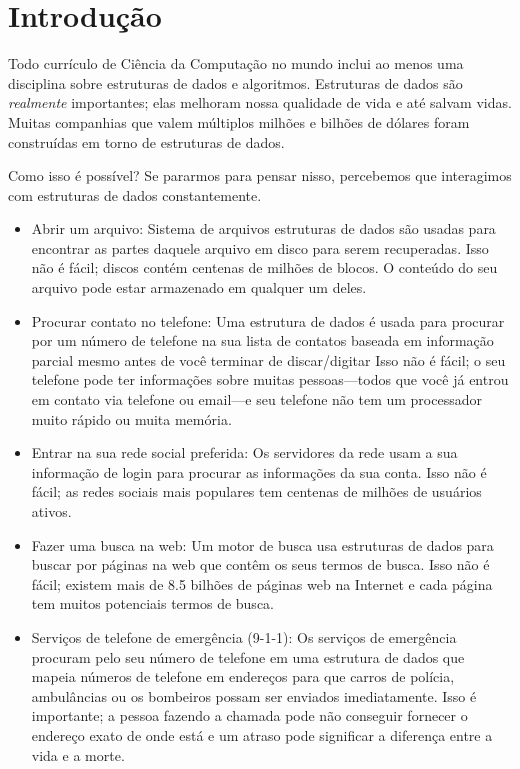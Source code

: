 \chapter{Introdução}
Todo currículo de Ciência da Computação no mundo inclui ao menos uma disciplina sobre estruturas de dados e algoritmos.
Estruturas de dados são \emph{realmente} importantes;
elas melhoram nossa qualidade de vida e até salvam vidas.
Muitas companhias que valem múltiplos milhões e bilhões de dólares foram construídas em torno de estruturas de dados.

Como isso é possível? Se pararmos para pensar nisso, percebemos que interagimos com estruturas de dados constantemente.

\begin{itemize}
  \item  Abrir um arquivo: Sistema de arquivos 
    estruturas de dados são usadas para encontrar
    as partes daquele arquivo em disco para serem recuperadas.
    Isso não é fácil; discos contém centenas de milhões de blocos.
    O conteúdo do seu arquivo pode estar armazenado em qualquer um deles.
  \item Procurar contato no telefone: Uma estrutura de dados é usada para procurar por um número de telefone na sua lista de contatos 
    baseada em informação parcial mesmo antes de você terminar de discar/digitar
    Isso não é fácil;
o seu telefone pode ter informações sobre muitas pessoas---todos que você já entrou em contato via telefone ou email---e seu telefone não tem um processador muito rápido ou muita memória.
  \item Entrar na sua rede social preferida:
    Os servidores da rede
    usam a sua informação de login para procurar as informações da sua conta.
    Isso não é fácil; as redes sociais mais populares tem centenas de milhões de usuários ativos.
  \item Fazer uma busca na web: 
    Um motor de busca usa estruturas de dados para buscar
    por páginas na web que contêm os seus termos de busca.
    Isso não é fácil; existem mais de 8.5 bilhões de páginas web na Internet
    e cada página tem muitos potenciais termos de busca.
  \item Serviços de telefone de emergência (9-1-1):
    Os serviços de emergência procuram pelo seu número de telefone em uma estrutura de dados que mapeia números de telefone em endereços para que carros de polícia, ambulâncias ou os bombeiros possam ser enviados imediatamente.
    Isso é importante; a pessoa fazendo a chamada pode não conseguir fornecer o endereço exato de onde está e um atraso pode significar a diferença entre a vida e a morte.
\end{itemize}

